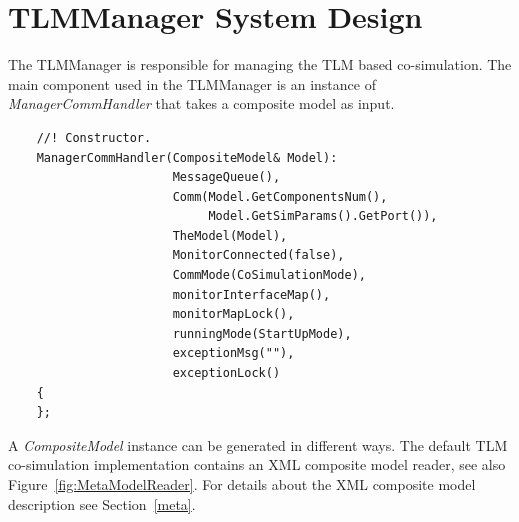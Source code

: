 \chapter{TLMManager System Design}
The TLMManager is responsible for managing the TLM based co-simulation. 
The main component used in the TLMManager is an instance of {\em ManagerCommHandler} that takes a composite model as input.
{\scriptsize
\begin{verbatim}
    //! Constructor.
    ManagerCommHandler(CompositeModel& Model):
                       MessageQueue(),
                       Comm(Model.GetComponentsNum(), 
                            Model.GetSimParams().GetPort()),
                       TheModel(Model),
                       MonitorConnected(false),
                       CommMode(CoSimulationMode),
                       monitorInterfaceMap(),
                       monitorMapLock(),
                       runningMode(StartUpMode),
                       exceptionMsg(""),
                       exceptionLock()
    {
    };
\end{verbatim}
}

A {\em CompositeModel} instance can be generated in different ways. 
The default TLM co-simulation implementation contains an XML composite model reader, see also Figure~\ref{fig:MetaModelReader}. 
For details about the XML composite model description see Section~\ref{meta}.

